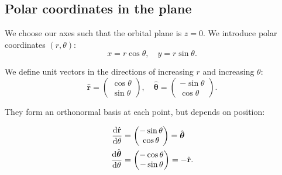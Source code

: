\documentclass[a4paper]{article}
\begin{document}
\subsection{Polar coordinates in the plane}
We choose our axes such that the orbital plane is $z = 0$. We introduce polar coordinates $(r, \theta)$:
\[
  x = r\cos\theta, \quad y = r\sin \theta.
\]
\begin{notation}
  We define unit vectors in the directions of increasing $r$ and increasing $\theta$:
  \[
    \hat{\mathbf{r}} = \begin{pmatrix}\cos \theta\\ \sin \theta\end{pmatrix}, \quad \hat{\boldsymbol\theta} = \begin{pmatrix}-\sin \theta\\\cos\theta \end{pmatrix}.
  \]
  \begin{center}
  \end{center}
  They form an orthonormal basis at each point, but depends on position:
\end{notation}
\begin{prop}
  \begin{align*}
    \frac{\mathrm{d} \hat{\mathbf{r}}}{\mathrm{d} \theta} &= \begin{pmatrix} -\sin \theta\\ \cos \theta\end{pmatrix} = \hat{\boldsymbol\theta}\\
    \frac{\mathrm{d} \hat{\boldsymbol\theta}}{\mathrm{d} \theta} &= \begin{pmatrix}-\cos \theta\\ -\sin \theta\end{pmatrix} = -\hat{\mathbf{r}}.
  \end{align*}
\end{prop}
\end{document}
